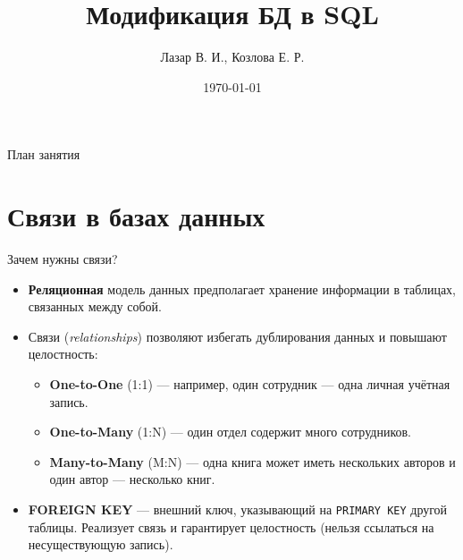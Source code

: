 \documentclass{beamer}
\title{Модификация БД в SQL}
\author{Лазар В. И., Козлова Е. Р.}
\date{\today}
\begin{document}
\begin{frame}
	\titlepage
\end{frame}

\begin{frame}{План занятия}
	\tableofcontents
\end{frame}

\section{Связи в базах данных}
\begin{frame}{Зачем нужны связи?}
	\begin{itemize}
		\item \textbf{Реляционная} модель данных предполагает хранение информации в таблицах, связанных между собой.
		\item Связи (\textit{relationships}) позволяют избегать дублирования данных и повышают целостность:
		      \begin{itemize}
			      \item \textbf{One-to-One} (1:1) — например, один сотрудник --- одна личная учётная запись.
			      \item \textbf{One-to-Many} (1:N) — один отдел содержит много сотрудников.
			      \item \textbf{Many-to-Many} (M:N) — одна книга может иметь нескольких авторов и один автор — несколько книг.
		      \end{itemize}
		\item \textbf{FOREIGN KEY} — внешний ключ, указывающий на \texttt{PRIMARY KEY} другой таблицы.
		      Реализует связь и гарантирует целостность (нельзя ссылаться на несуществующую запись).
	\end{itemize}
\end{frame}

\end{document}
